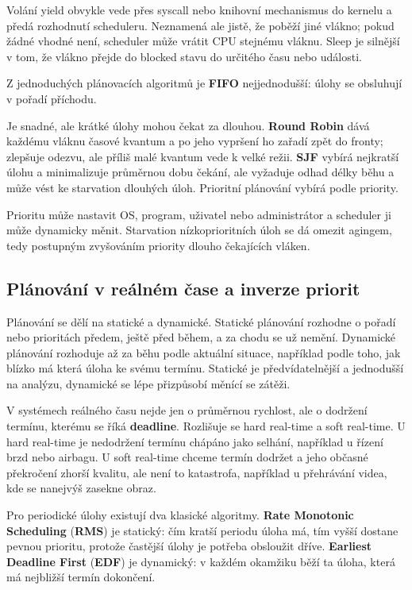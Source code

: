 Volání yield obvykle vede přes syscall nebo knihovní mechanismus do kernelu a předá rozhodnutí scheduleru. Neznamená ale jistě, že poběží jiné vlákno; pokud žádné vhodné není, scheduler může vrátit CPU stejnému vláknu. Sleep je silnější v tom, že vlákno přejde do blocked stavu do určitého času nebo události.

Z jednoduchých plánovacích algoritmů je \textbf{FIFO} nejjednodušší: úlohy se obsluhují v pořadí příchodu.

Je snadné, ale krátké úlohy mohou čekat za dlouhou. \textbf{Round Robin} dává každému vláknu časové kvantum a po jeho vypršení ho zařadí zpět do fronty; zlepšuje odezvu, ale příliš malé kvantum vede k velké režii. \textbf{SJF} vybírá nejkratší úlohu a minimalizuje průměrnou dobu čekání, ale vyžaduje odhad délky běhu a může vést ke starvation dlouhých úloh. Prioritní plánování vybírá podle priority.

Prioritu může nastavit OS, program, uživatel nebo administrátor a scheduler ji může dynamicky měnit. Starvation nízkoprioritních úloh se dá omezit agingem, tedy postupným zvyšováním priority dlouho čekajících vláken.

\subsection*{Plánování v reálném čase a inverze priorit}

Plánování se dělí na statické a dynamické. Statické plánování rozhodne o pořadí nebo prioritách předem, ještě před během, a za chodu se už nemění. Dynamické plánování rozhoduje až za běhu podle aktuální situace, například podle toho, jak blízko má která úloha ke svému termínu. Statické je předvídatelnější a jednodušší na analýzu, dynamické se lépe přizpůsobí měnící se zátěži.

V systémech reálného času nejde jen o průměrnou rychlost, ale o dodržení termínu, kterému se říká \textbf{deadline}. Rozlišuje se hard real-time a soft real-time. U hard real-time je nedodržení termínu chápáno jako selhání, například u řízení brzd nebo airbagu. U soft real-time chceme termín dodržet a jeho občasné překročení zhorší kvalitu, ale není to katastrofa, například u přehrávání videa, kde se nanejvýš zasekne obraz.

Pro periodické úlohy existují dva klasické algoritmy. \textbf{Rate Monotonic Scheduling} (\textbf{RMS}) je statický: čím kratší periodu úloha má, tím vyšší dostane pevnou prioritu, protože častější úlohy je potřeba obsloužit dříve. \textbf{Earliest Deadline First} (\textbf{EDF}) je dynamický: v každém okamžiku běží ta úloha, která má nejbližší termín dokončení.

